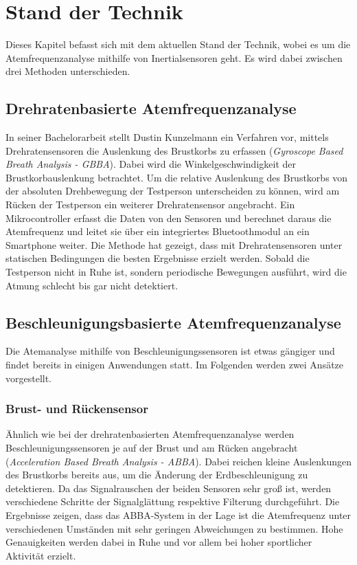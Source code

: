 \lhead[\chaptername~\thechapter]{\rightmark}


\rhead[\leftmark]{}


\lfoot[\thepage]{}


\cfoot{}


\rfoot[]{\thepage}

\chapter{Stand der Technik}
Dieses Kapitel befasst sich mit dem aktuellen Stand der Technik, wobei es um die Atemfrequenzanalyse mithilfe von Inertialsensoren geht. Es wird dabei zwischen drei Methoden unterschieden.

\section{Drehratenbasierte Atemfrequenzanalyse}
In seiner Bachelorarbeit stellt Dustin Kunzelmann ein Verfahren vor, mittels Drehratensensoren die Auslenkung des Brustkorbs zu erfassen (\textit{Gyroscope Based Breath Analysis - GBBA}). Dabei wird die Winkelgeschwindigkeit der Brustkorbauslenkung betrachtet. Um die relative Auslenkung des Brustkorbs von der absoluten Drehbewegung der Testperson unterscheiden zu können, wird am Rücken der Testperson ein weiterer Drehratensensor angebracht. Ein Mikrocontroller erfasst die Daten von den Sensoren und berechnet daraus die Atemfrequenz und leitet sie über ein integriertes Bluetoothmodul an ein Smartphone weiter. Die Methode hat gezeigt, dass mit Drehratensensoren unter statischen Bedingungen die besten Ergebnisse erzielt werden. Sobald die Testperson nicht in Ruhe ist, sondern periodische Bewegungen ausführt, wird die Atmung schlecht bis gar nicht detektiert\cite{gabba}.

\section{Beschleunigungsbasierte Atemfrequenzanalyse}
Die Atemanalyse mithilfe von Beschleunigungssensoren ist etwas gängiger und findet bereits in einigen Anwendungen statt. Im Folgenden werden zwei Ansätze vorgestellt.

	\subsection*{Brust- und Rückensensor}
	Ähnlich wie bei der drehratenbasierten Atemfrequenzanalyse werden Beschleunigungssensoren je auf der Brust und am Rücken angebracht (\textit{Acceleration Based Breath Analysis - ABBA}). Dabei reichen kleine Auslenkungen des Brustkorbs bereits aus, um die Änderung der Erdbeschleunigung zu detektieren. Da das Signalrauschen der beiden Sensoren sehr groß ist, werden verschiedene Schritte der Signalglättung respektive Filterung durchgeführt. Die Ergebnisse zeigen, dass das ABBA-System in der Lage ist die Atemfrequenz unter verschiedenen Umständen mit sehr geringen Abweichungen zu bestimmen. Hohe Genauigkeiten werden dabei in Ruhe und vor allem bei hoher sportlicher Aktivität erzielt\cite{abba}.


